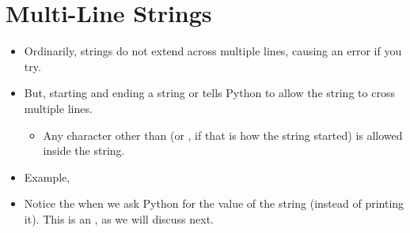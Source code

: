 \documentclass[letterpaper,10pt,english]{sphinxmanual}
\begin{document}
\section{Multi-Line Strings}
\label{\detokenize{lecture_notes/lec03_strings:multi-line-strings}}\begin{itemize}
\item {} 
Ordinarily, strings do not extend across multiple lines, causing an
error if you try.

\item {} 
But, starting and ending a string  or  tells Python to
allow the string to cross multiple lines.
\begin{itemize}
\item {} 
Any character other than  (or , if that is how the
string started) is allowed inside the string.

\end{itemize}

\item {} 
Example,

%
\begin{sphinxVerbatim}[commandchars=\\\{\}]
  
 
\end{sphinxVerbatim}

\item {} 
Notice the  when we ask Python for the value of the string
(instead of printing it). This is an , as we will
discuss next.

\end{itemize}
\end{document}
